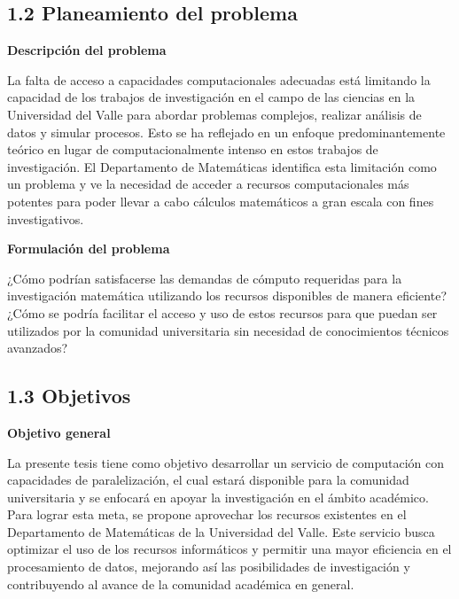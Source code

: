 \begin{doublespace}
\begin{multicols}{2}
    \subsection{1.2 Planeamiento del problema}

    \textbf{Descripción del problema}
    \vspace{3mm}

    La falta de acceso a capacidades computacionales adecuadas está limitando la capacidad de los trabajos de investigación en el campo de las ciencias en la Universidad del Valle para abordar problemas complejos, realizar análisis de datos y simular procesos. Esto se ha reflejado en un enfoque predominantemente teórico en lugar de computacionalmente intenso en estos trabajos de investigación. El Departamento de Matemáticas identifica esta limitación como un problema y ve la necesidad de acceder a recursos computacionales más potentes para poder llevar a cabo cálculos matemáticos a gran escala con fines investigativos.
    \vspace{3mm}

    \textbf{Formulación del problema}
    \vspace{3mm}

    ¿Cómo podrían satisfacerse las demandas de cómputo requeridas para la investigación matemática utilizando los recursos disponibles de manera eficiente? ¿Cómo se podría facilitar el acceso y uso de estos recursos para que puedan ser utilizados por la comunidad universitaria sin necesidad de conocimientos técnicos avanzados?
    \vspace{3mm}

    \subsection{1.3 Objetivos}

    \textbf{Objetivo general}

    La presente tesis tiene como objetivo desarrollar un servicio de computación con capacidades de paralelización, el cual estará disponible para la comunidad universitaria y se enfocará en apoyar la investigación en el ámbito académico. Para lograr esta meta, se propone aprovechar los recursos existentes en el Departamento de Matemáticas de la Universidad del Valle. Este servicio busca optimizar el uso de los recursos informáticos y permitir una mayor eficiencia en el procesamiento de datos, mejorando así las posibilidades de investigación y contribuyendo al avance de la comunidad académica en general.
    \vspace{3mm}


\end{multicols}
\end{doublespace}
